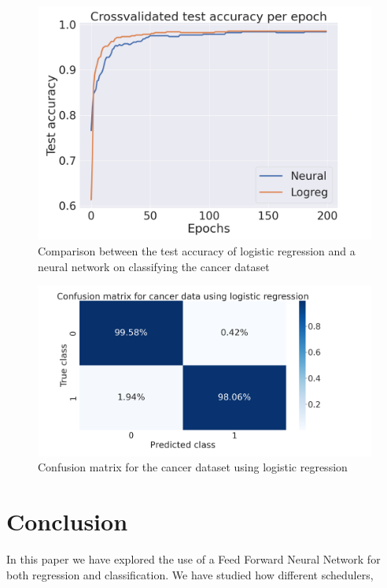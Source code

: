 \documentclass[onecolumn,10pt,cleanfoot]{asme2ej}
\begin{document}
\begin{figure}[h]
\centerline{\includegraphics[width=5in]{figure/cancerlogneur.png}}
\caption{Comparison between the test accuracy of logistic regression and a neural network on classifying the cancer dataset}
\label{cancerlogneur}
\end{figure}

\begin{figure}[h]
\centerline{\includegraphics[width=5in]{figure/cancerconflog.png}}
\caption{Confusion matrix for the cancer dataset using logistic regression}
\label{cancerconflog}
\end{figure}

\section{Conclusion}

In this paper we have explored the use of a Feed Forward Neural Network for both regression and classification. We have studied how different schedulers, 



\end{document}
